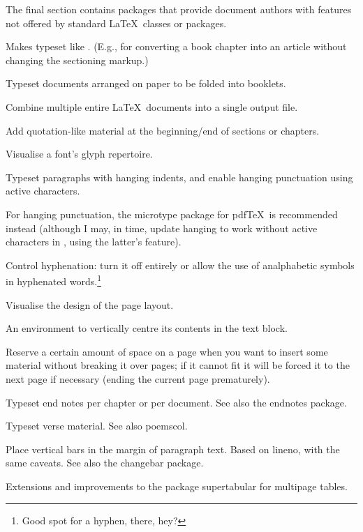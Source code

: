 \documentclass{ltugboat}
\begin{document}
The final section contains packages that provide document authors with features not offered by standard \LaTeX\ classes or packages.

\begin{description}[font=\normalfont\sffamily]
\item [anonchap] Makes  typeset like . (E.g., for converting a book chapter into an article without changing the sectioning markup.)

\item [booklet]  Typeset documents arranged on paper to be folded into booklets.
\item [combine]  Combine multiple entire \LaTeX\ documents into a single output file.

\item [epigraph] Add quotation-like material at the beginning/end of sections or chapters.

\item [fonttable] Visualise a font's glyph repertoire.

\item [hanging]  Typeset paragraphs with hanging indents, and enable hanging punctuation using active characters.

For hanging punctuation, the \textsf{microtype} package for pdf\/\TeX\ is recommended instead (although I may, in time, update \textsf{hanging} to work without active characters in \XeTeX, using the latter's  feature).
\item [hyphenat] Control hyphenation: turn it off entirely or allow the use of analphabetic symbols in hyphenated words.\footnote{Good spot for a hyphen, there, hey?}
\item [layouts] Visualise the design of the page layout.
\item [midpage] An environment to vertically centre its contents in the text block.
\item [needspace] Reserve a certain amount of space on a page when you want to insert some material without breaking it over pages; if it cannot fit it will be forced it to the next page if necessary (ending the current page prematurely).
\item [pagenote] Typeset end notes per chapter or per document. See also the \textsf{endnotes} package.
\item [verse] Typeset verse material. See also \textsf{poemscol}.
\item [vertbars] Place vertical bars in the margin of paragraph text. Based on \textsf{lineno}, with the same caveats. See also the \textsf{changebar} package.
\item [xtab] Extensions and improvements to the package \textsf{supertabular} for multipage tables.
\end{description}
\end{document}
